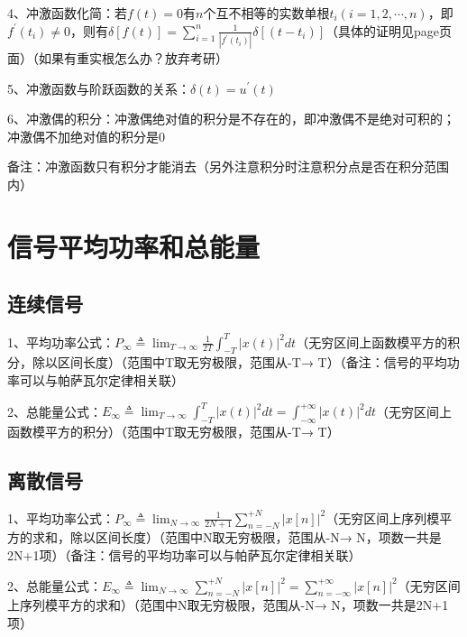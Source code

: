 4、冲激函数化简：若$f(t)=0$有$n$个互不相等的实数单根$t_{i}(i=1,2, \cdots, n)$，即$f^{\prime}\left(t_{i}\right) \neq 0$，则有$\delta[f(t)]=\sum_{i=1}^{n} \frac{1}{\left|f^{\prime}\left(t_{i}\right)\right|} \delta\left[\left(t-t_{i}\right)\right]$（具体的证明见page页面）（如果有重实根怎么办？放弃考研）

5、冲激函数与阶跃函数的关系：$\delta(t)= u^{\prime}(t)$

6、冲激偶的积分：冲激偶绝对值的积分是不存在的，即冲激偶不是绝对可积的；冲激偶不加绝对值的积分是0

备注：冲激函数只有积分才能消去（另外注意积分时注意积分点是否在积分范围内）

\section{信号平均功率和总能量}



\subsection{连续信号}

1、平均功率公式：$P_{\infty} \triangleq \lim_{T \rightarrow \infty} \frac{1}{2 T} \int_{-T}^{T}|x(t)|^{2} d t$（无穷区间上函数模平方的积分，除以区间长度）（范围中T取无穷极限，范围从-T→ T）（备注：信号的平均功率可以与帕萨瓦尔定律相关联）

2、总能量公式：$E_{\infty} \triangleq \lim_{T \rightarrow \infty} \int_{-T}^{T}|x(t)|^{2} d t=\int_{-\infty}^{+\infty}|x(t)|^{2} d t$（无穷区间上函数模平方的积分）（范围中T取无穷极限，范围从-T→ T）



\subsection{离散信号}

1、平均功率公式：$P_{\infty} \triangleq \lim_{N \rightarrow \infty} \frac{1}{2 N+1} \sum_{n=-N}^{+N}|x[n]|^{2}$（无穷区间上序列模平方的求和，除以区间长度）（范围中N取无穷极限，范围从-N→ N，项数一共是2N+1项）（备注：信号的平均功率可以与帕萨瓦尔定律相关联）

2、总能量公式：$E_{\infty} \triangleq \lim_{N \rightarrow \infty} \sum_{n=-N}^{+N}|x[n]|^{2}=\sum_{n=-\infty}^{+\infty}|x[n]|^{2}$（无穷区间上序列模平方的求和）（范围中N取无穷极限，范围从-N→ N，项数一共是2N+1项）



